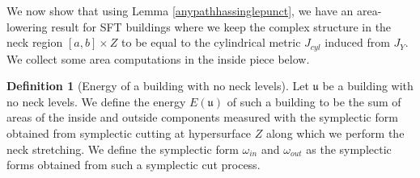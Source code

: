 \documentclass[11pt, oneside,dvipsnames]{amsart}
\newcommand{\of}{\circ}
\renewcommand{\to}{\rightarrow}
\renewcommand{\to}{\rightarrow}
\newcommand{\<}{\langle}
\renewcommand{\>}{\rangle}
\newcommand{\inn}{{in}}
\newcommand{\bD}{\mathbb{D}}
\newcommand{\bH}{\mathbb{H}}
\newcommand{\bP}{\mathbb{P}}
\newcommand{\bR}{\mathbb{R}}
\newcommand{\cL}{\mathcal{L}}
\newcommand{\sm}{\ensuremath{\setminus}}
\renewcommand{\to}{\rightarrow}
\theoremstyle{definition}
\theoremstyle{definition}
\newtheorem{defn}[Theorem]{Definition}
\numberwithin{equation}{subsection}
\begin{document}





    

\noindent We now show that using Lemma \ref{anypathhassinglepunct}, we have an area-lowering result for SFT buildings where we keep the complex structure in the neck region $[a,b]\times Z$ to be equal to the cylindrical metric $J_{cyl}$ induced from $J_Y$. We collect some area computations in the inside piece below.


\begin{defn}[Energy of a building with no neck levels]
    Let $\mathfrak{u}$ be a building with no neck levels. We define the energy $E(\mathfrak{u})$ of such a building to be the sum of areas of the inside and outside components measured with the symplectic form obtained from symplectic cutting at hypersurface $Z$ along which we perform the neck stretching. We define the symplectic form $\omega_\inn$ and $\omega_{out}$ as the symplectic forms obtained from such a symplectic cut process.
\end{defn}
\end{document}
